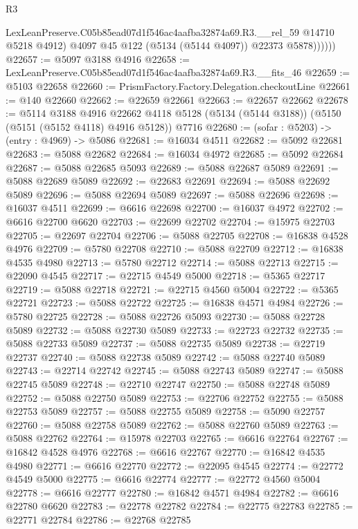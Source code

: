 \begin{lexlean}{R3}
\begin{coremodule}
                LexLeanPreserve.C05b85ead07d1f546ac4aafba32874a69.R3.__rel_59 @14710 @5218 @4912)
                @4097
                @45
                @122
                (@5134 (@5144 @4097))
                @22373
                @5878))))))
@22657 := @5097 @3188 @4916
@22658 := LexLeanPreserve.C05b85ead07d1f546ac4aafba32874a69.R3.__fits_46
@22659 := @5103 @22658
@22660 := PrismFactory.Factory.Delegation.checkoutLine
@22661 := @140 @22660
@22662 := @22659 @22661
@22663 := @22657 @22662
@22678 := @5114
    @3188
    @4916
    @22662
    @4118
    @5128
    (@5134 (@5144 @3188))
    (@5150 (@5151 (@5152 @4118) @4916 @5128))
    @7716
@22680 := (sofar : @5203) -> (entry : @4969) -> @5086
@22681 := @16034 @4511
@22682 := @5092 @22681
@22683 := @5088 @22682
@22684 := @16034 @4972
@22685 := @5092 @22684
@22687 := @5088 @22685 @5093
@22689 := @5088 @22687 @5089
@22691 := @5088 @22689 @5089
@22692 := @22683 @22691
@22694 := @5088 @22692 @5089
@22696 := @5088 @22694 @5089
@22697 := @5088 @22696
@22698 := @16037 @4511
@22699 := @6616 @22698
@22700 := @16037 @4972
@22702 := @6616 @22700 @6620
@22703 := @22699 @22702
@22704 := @15975 @22703
@22705 := @22697 @22704
@22706 := @5088 @22705
@22708 := @16838 @4528 @4976
@22709 := @5780 @22708
@22710 := @5088 @22709
@22712 := @16838 @4535 @4980
@22713 := @5780 @22712
@22714 := @5088 @22713
@22715 := @22090 @4545
@22717 := @22715 @4549 @5000
@22718 := @5365 @22717
@22719 := @5088 @22718
@22721 := @22715 @4560 @5004
@22722 := @5365 @22721
@22723 := @5088 @22722
@22725 := @16838 @4571 @4984
@22726 := @5780 @22725
@22728 := @5088 @22726 @5093
@22730 := @5088 @22728 @5089
@22732 := @5088 @22730 @5089
@22733 := @22723 @22732
@22735 := @5088 @22733 @5089
@22737 := @5088 @22735 @5089
@22738 := @22719 @22737
@22740 := @5088 @22738 @5089
@22742 := @5088 @22740 @5089
@22743 := @22714 @22742
@22745 := @5088 @22743 @5089
@22747 := @5088 @22745 @5089
@22748 := @22710 @22747
@22750 := @5088 @22748 @5089
@22752 := @5088 @22750 @5089
@22753 := @22706 @22752
@22755 := @5088 @22753 @5089
@22757 := @5088 @22755 @5089
@22758 := @5090 @22757
@22760 := @5088 @22758 @5089
@22762 := @5088 @22760 @5089
@22763 := @5088 @22762
@22764 := @15978 @22703
@22765 := @6616 @22764
@22767 := @16842 @4528 @4976
@22768 := @6616 @22767
@22770 := @16842 @4535 @4980
@22771 := @6616 @22770
@22772 := @22095 @4545
@22774 := @22772 @4549 @5000
@22775 := @6616 @22774
@22777 := @22772 @4560 @5004
@22778 := @6616 @22777
@22780 := @16842 @4571 @4984
@22782 := @6616 @22780 @6620
@22783 := @22778 @22782
@22784 := @22775 @22783
@22785 := @22771 @22784
@22786 := @22768 @22785

\end{coremodule}
\end{lexlean}
